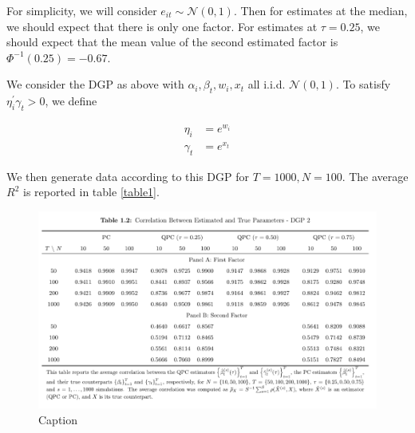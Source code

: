 \documentclass{article}
\begin{document}
For simplicity, we will consider $e_{it} \sim \mathcal{N}(0, 1)$. Then for estimates at the median, we should expect that there is only one factor. For estimates at $\tau = 0.25$, we should expect that the mean value of the second estimated factor is  $\Phi^{-1}(0.25) = -0.67$.

We consider the DGP as above with $\alpha_i, \beta_t, w_i, x_t$ all i.i.d. $\mathcal{N}(0, 1)$. To satisfy $\eta_i^{\prime}\gamma_t > 0$, we define 

\begin{align*} 
	\eta_i  &= e^{w_i} \\
	\gamma_t &= e^{x_t} 
\end{align*}

We then generate data according to this DGP for $T = 1000, N = 100$. The average $R^2$ is reported in table \ref{table1}. 

\begin{figure}
	\centering
    \includegraphics[width=0.9\linewidth]{../out/sagner_t2.png}
    \caption{Caption}
    \label{fig:enter-label}
\end{figure}
\end{document}
